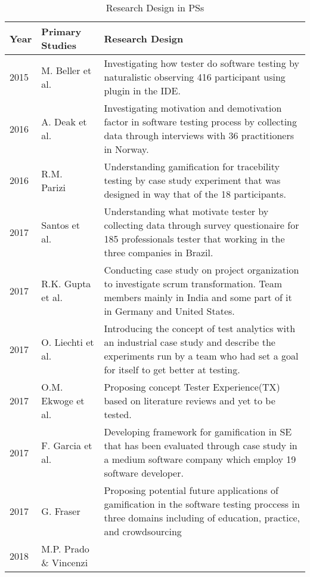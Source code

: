 \documentclass[conference, compsoc, twoside]{IEEEtran}
\begin{document}
\begin{table*}[h]
\centering
    \caption{Research Design in PSs}
    \label{tab:researchdesignps}
    \begin{tabular}{p{0.6cm} |p{2cm}| p{12cm}}
      \textbf{Year} & \textbf{Primary Studies} & \textbf{Research Design} \\
      \hline
      2015 & M. Beller et al.\cite{Beller2015} & 
        Investigating how tester do software testing by naturalistic observing 416 participant using plugin in the IDE.\\
      2016 & A. Deak et al.~\cite{Deak2016} & 
        Investigating motivation and demotivation factor in software testing process by collecting data through interviews with 36 practitioners in Norway. \\    
      2016 & R.M. Parizi~\cite{Parizi2016193} & 
        Understanding gamification for tracebility testing by case study experiment that was designed in way that of the 18 participants.\\
      2017 & Santos et al.~\cite{Santos201795} & 
        Understanding what motivate tester by collecting data through survey questionaire for 185 professionals tester that working in the three companies in Brazil. \\
      2017 & R.K. Gupta et al.~\cite{Gupta2017} & 
        Conducting case study on project organization to investigate scrum transformation. Team members mainly in India and some part of it in Germany and United States.\\
      2017 & O. Liechti et al.~\cite{Liechti2017} &
         Introducing the concept of test analytics with an industrial case study and describe the experiments run by a team who had set a goal for itself to get better at testing. \\
      2017 & O.M. Ekwoge et al.~\cite{Ekwoge2017208} &
         Proposing concept Tester Experience(TX) based on literature reviews and yet to be tested.\\
      2017 & F. Garcia et al.~\cite{Garcia2017} &
         Developing framework for gamification in SE that has been evaluated through case study in a medium software company which employ 19 software developer.  \\ 
      2017 & G. Fraser~\cite{Fraser2017} &
         Proposing potential future applications of gamification in the software testing proccess in three domains including of education, practice, and crowdsourcing \\ 
      2018 & M.P. Prado \& Vincenzi~\cite{Prado2018} &

\end{tabular}
\end{table*}
\end{document}
